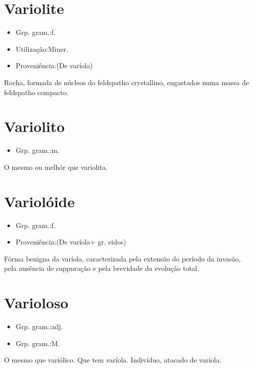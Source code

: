 \documentclass{article}
\begin{document}
\section{Variolite}
\begin{itemize}
\item {Grp. gram.:f.}
\end{itemize}
\begin{itemize}
\item {Utilização:Miner.}
\end{itemize}
\begin{itemize}
\item {Proveniência:(De \textunderscore varíola\textunderscore )}
\end{itemize}
Rocha, formada de núcleos do feldspatho crystallino, engastados numa massa de feldspatho compacto.
\section{Variolito}
\begin{itemize}
\item {Grp. gram.:m.}
\end{itemize}
O mesmo ou melhór que \textunderscore variolita\textunderscore .
\section{Variolóide}
\begin{itemize}
\item {Grp. gram.:f.}
\end{itemize}
\begin{itemize}
\item {Proveniência:(De \textunderscore varíola\textunderscore  + gr. \textunderscore eidos\textunderscore )}
\end{itemize}
Fórma benigna da varíola, caracterizada pela extensão do período da invasão, pela ausência de suppuração e pela brevidade da evolução total.
\section{Varioloso}
\begin{itemize}
\item {Grp. gram.:adj.}
\end{itemize}
\begin{itemize}
\item {Grp. gram.:M.}
\end{itemize}
O mesmo que \textunderscore variólico\textunderscore .
Que tem varíola.
Indivíduo, atacado de varíola.
\end{document}

